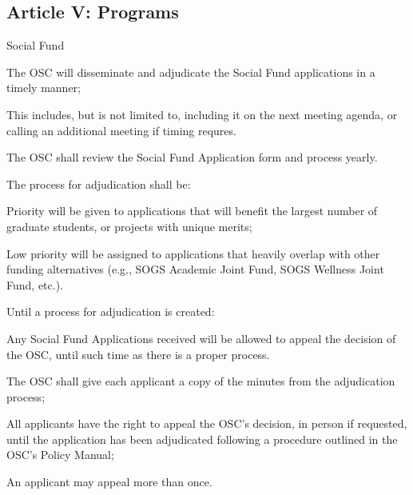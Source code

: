 \subsection{Article V: Programs}
\begin{longenum}[ label*=\thesubsection.\arabic*., align=left] 
\item Social Fund
		\begin{longenum}[label*=\arabic*., align=left]
		\item The OSC will disseminate and adjudicate the Social Fund applications in a timely manner;
			\begin{longenum}[label*=\arabic*., align=left]
			\item This includes, but is not limited to, including it on the next meeting agenda, or calling an additional meeting if timing requres.
			\end{longenum}
		\item The OSC shall review the Social Fund Application form and process yearly.
		\item The process for adjudication shall be:
			\begin{longenum}[label*=\arabic*., align=left]
			\item Priority will be given to applications that will benefit the largest number of graduate students, or projects with unique merits;
			\item Low priority will be assigned to applications that heavily overlap with other funding alternatives (e.g., SOGS Academic Joint Fund, SOGS Wellness Joint Fund, etc.).
			\item Until a process for adjudication is created:
				\begin{longenum}[label*=\arabic*., align=left]
				\item Any Social Fund Applications received will be allowed to appeal the decision of the OSC, until such time as there is a proper process.
					\begin{longenum}[label*=\arabic*., align=left]
					\item The OSC shall give each applicant a copy of the minutes from the adjudication process;
					\item All applicants have the right to appeal the OSC's decision, in person if requested, until the application has been adjudicated following a procedure outlined in the OSC's Policy Manual;
						\begin{longenum}[label*=\arabic*., align=left]
						\item An applicant may appeal more than once.

\end{longenum}
\end{longenum}
\end{longenum}
\end{longenum}
\end{longenum}
\end{longenum}
